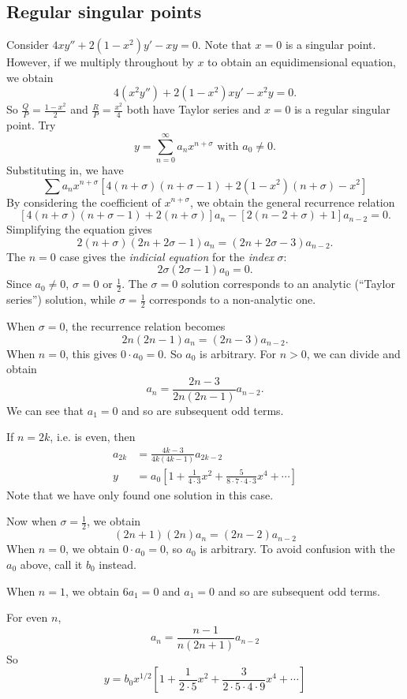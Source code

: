 \documentclass[a4paper]{article}
\begin{document}
\subsection{Regular singular points}
\begin{eg}
  Consider $4xy'' + 2(1 - x^2)y' - xy = 0$. Note that $x = 0$ is a singular point. However, if we multiply throughout by $x$ to obtain an equidimensional equation, we obtain
\[
4(x^2 y'') + 2(1 - x^2)xy' - x^2 y = 0.
\]
So $\frac{Q}{P} = \frac{1 - x^2}{2}$ and $\frac{R}{P} = \frac{x^2}{4}$ both have Taylor series and $x = 0$ is a regular singular point. Try
\[
y = \sum_{n = 0}^\infty a_n x^{n + \sigma}\text{ with }a_0 \not= 0.
\]
Substituting in, we have
\[
\sum a_n x^{n + \sigma}[4(n + \sigma)(n + \sigma - 1) + 2(1 - x^2)(n + \sigma) - x^2]
\]
By considering the coefficient of $x^{n + \sigma}$, we obtain the general recurrence relation
\[
[4(n + \sigma)(n + \sigma - 1) + 2(n + \sigma)]a_n -[2(n - 2 + \sigma) + 1]a_{n - 2} = 0.
\]
Simplifying the equation gives
\[
2(n + \sigma)(2n + 2\sigma - 1)a_n = (2n + 2\sigma-3)a_{n - 2}.
\]
The $n = 0$  case gives the \emph{indicial equation} for the \emph{index} $\sigma$:
\[
2\sigma(2\sigma - 1)a_0 = 0.
\]
Since $a_0 \not= 0$, $\sigma = 0$ or $\frac{1}{2}$. The $\sigma = 0$ solution corresponds to an analytic (``Taylor series'') solution, while $\sigma = \frac{1}{2}$ corresponds to a non-analytic one.

When $\sigma = 0$, the recurrence relation becomes
\[
2n(2n - 1)a_n = (2n - 3)a_{n - 2}.
\]
When $n = 0$, this gives $0\cdot a_0 = 0$. So $a_0$ is arbitrary. For $n >0$, we can divide and obtain
\[
a_n = \frac{2n - 3}{2n(2n - 1)}a_{n - 2}.
\]
We can see that $a_1 = 0$ and so are subsequent odd terms.

If $n = 2k$, i.e. is even, then
\begin{align*}
  a_{2k} &= \frac{4k - 3}{4k(4k - 1)}a_{2k - 2}\\
  y &= a_0\left[1 + \frac{1}{4\cdot 3}x^2 + \frac{5}{8\cdot 7\cdot 4\cdot 3}x^4 + \cdots\right]
\end{align*}
Note that we have only found one solution in this case.

Now when $\sigma = \frac{1}{2}$, we obtain
\[
(2n + 1)(2n)a_n = (2n - 2)a_{n - 2}
\]
When $n = 0$, we obtain $0\cdot a_0 = 0$, so $a_0$ is arbitrary. To avoid confusion with the $a_0$ above, call it $b_0$ instead.

When $n = 1$, we obtain $6a_1 = 0$ and $a_1 = 0$ and so are subsequent odd terms.

For even $n$,
\[
a_n = \frac{n - 1}{n(2n + 1)}a_{n - 2}
\]
So 
\[
y = b_0 x^{1/2}\left[1 + \frac{1}{2\cdot 5}x^2 + \frac{3}{2\cdot 5\cdot 4\cdot 9}x^4 + \cdots\right]
\]
\end{eg}
\end{document}
